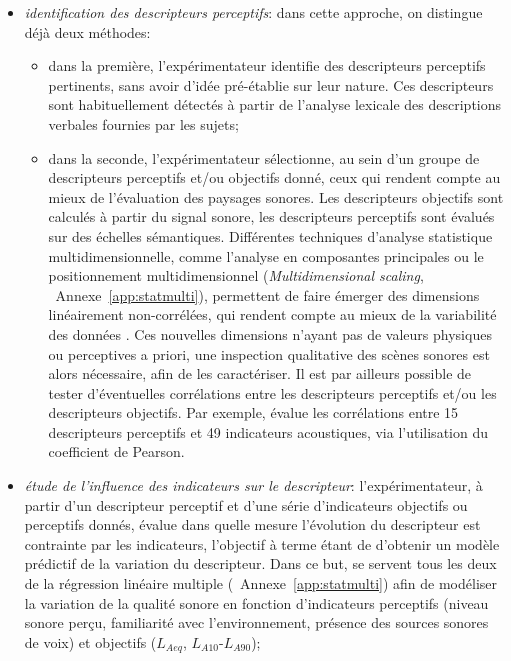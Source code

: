 \begin{itemize}

\item \emph{identification des descripteurs perceptifs}: dans cette approche, on distingue déjà deux méthodes:

\begin{itemize}
\item dans la première, l'expérimentateur identifie des descripteurs perceptifs pertinents, sans avoir d'idée pré-établie sur leur nature. Ces descripteurs sont habituellement détectés à partir de l'analyse lexicale des descriptions verbales fournies par les sujets;

\item dans la seconde, l'expérimentateur sélectionne, au sein d'un groupe de descripteurs perceptifs et/ou objectifs donné, ceux qui rendent compte au mieux de l'évaluation des paysages sonores. Les descripteurs objectifs sont calculés à partir du signal sonore, les descripteurs perceptifs sont évalués sur des échelles sémantiques. Différentes techniques d'analyse statistique multidimensionnelle, comme l'analyse en composantes principales ou le positionnement multidimensionnel (\emph{Multidimensional scaling}, \cf~Annexe~\ref{app:statmulti}), permettent de faire émerger des dimensions linéairement non-corrélées, qui rendent compte au mieux de la variabilité des données \citep{cain2013development,torija2013application}. Ces nouvelles dimensions n'ayant pas de valeurs physiques ou perceptives a priori, une inspection qualitative des scènes sonores est alors nécessaire, afin de les caractériser. Il est par ailleurs possible de tester d'éventuelles corrélations entre les descripteurs perceptifs et/ou les descripteurs objectifs. Par exemple, \citep{torija2013application} évalue les corrélations entre 15 descripteurs perceptifs et 49 indicateurs acoustiques, via l'utilisation du coefficient de Pearson.
\end{itemize}

\item \emph{étude de l'influence des indicateurs sur le descripteur}: l'expérimentateur, à partir d'un descripteur perceptif et d'une série d'indicateurs objectifs ou perceptifs donnés, évalue dans quelle mesure l'évolution du descripteur est contrainte par les indicateurs, l'objectif à terme étant de d'obtenir un modèle prédictif de la variation du descripteur. Dans ce but, \citep{lavandier2006contribution,ricciardi2015sound} se servent tous les deux de la régression linéaire multiple (\cf~Annexe~\ref{app:statmulti}) afin de modéliser la variation de la qualité sonore en fonction d'indicateurs perceptifs (niveau sonore perçu, familiarité avec l'environnement, présence des sources sonores de voix) et objectifs ($L_{Aeq}$, $L_{A10}$-$L_{A90}$);


\end{itemize}
